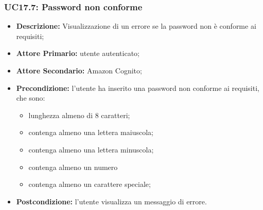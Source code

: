 \subsubsection{UC17.7: Password non conforme}
\label{sec:UC17.7}
\begin{itemize}
    \item \textbf{Descrizione:} Visualizzazione di un errore se la password non è conforme ai requisiti;
    \item \textbf{Attore Primario:} utente autenticato;
    \item \textbf{Attore Secondario:} Amazon Cognito;
    \item \textbf{Precondizione:} l'utente ha inserito una password non conforme ai requisiti, che sono:
          \begin{itemize}
              \item lunghezza almeno di 8 caratteri;
              \item contenga almeno una lettera maiuscola;
              \item contenga almeno una lettera minuscola;
              \item contenga almeno un numero
              \item contenga almeno un carattere speciale;
          \end{itemize}
    \item \textbf{Postcondizione:} l'utente visualizza un messaggio di errore.
\end{itemize}